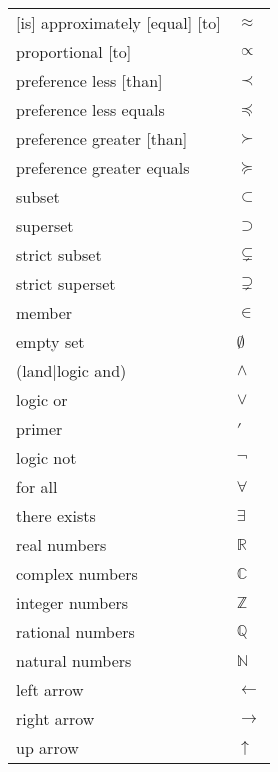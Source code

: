 \documentclass[12pt, a4paper]{article}
\begin{document}
\begin{longtable}{ll}
{[is]} approximately [equal] [to] & $\approx$ \\
proportional [to] & $\propto$ \\
preference less [than] & $\prec$ \\
preference less equals & $\preceq$ \\
preference greater [than] & $\succ$ \\
preference greater equals & $\succeq$ \\
subset & $\subset$ \\
superset & $\supset$ \\
strict subset & $\subsetneq$ \\
strict superset & $\supsetneq$ \\
member & $\in$ \\
empty set & $\emptyset$ \\
(land|logic and) & $\land$ \\
logic or & $\lor$ \\
primer & $\prime$ \\
logic not & $\lnot$ \\
for all & $\forall$ \\
there exists & $\exists$ \\
real numbers & $\mathbb{R}$ \\
complex numbers & $\mathbb{C}$ \\
integer numbers & $\mathbb{Z}$ \\
rational numbers & $\mathbb{Q}$ \\
natural numbers & $\mathbb{N}$ \\
left arrow & $\leftarrow$ \\
right arrow & $\rightarrow$ \\
up arrow & $\uparrow$ \\

\end{longtable}
\end{document}
